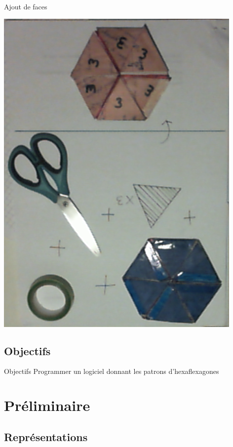 \documentclass[french,xcolor=dvipsnames]{beamer}
\begin{document}
		\begin{frame}{Ajout de faces}
		
		\begin{center}
		\includegraphics[scale=0.3]{outils_ajout_face.png}
		\end{center}
		\end{frame}
		
		\subsection{Objectifs}
		\begin{frame}{Objectifs}
			Programmer un logiciel donnant les patrons d'hexaflexagones
		\end{frame}
		
		
	\section{Préliminaire}
	
		\subsection{Représentations}
		
\end{document}
